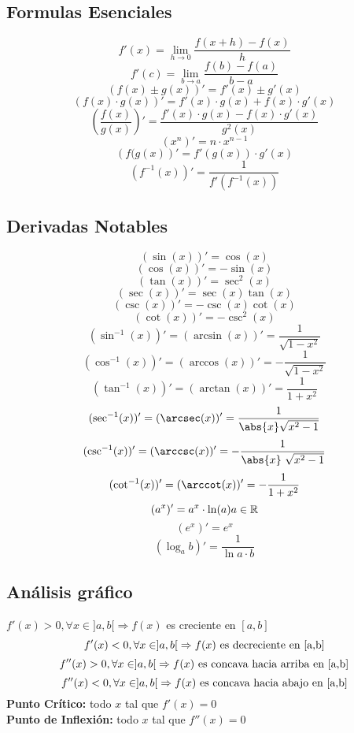 \headingFormulaSheet%
\subsection*{Formulas Esenciales}%
%
\[ f'(x)=\lim_{h \to 0}\frac{f(x+h)-f(x)}{h}\]
\[ f'(c)=\lim_{b\to a}\frac{f(b)-f(a)}{b-a}\]
\[(f(x)\pm g(x))'=f'(x)\pm g'(x) \]
\[ (f(x) \cdot g(x))'=f'(x) \cdot g(x) + f(x) \cdot g'(x)\]
\[ \left(\frac{f(x)}{g(x)}\right)'= \frac{f'(x)\cdot g(x)-f(x)\cdot g'(x)}{g^{2}(x)}
\]
\[\left(x^{n} \right)'= n\cdot x^{n-1}\]
\[ \left(f(g(x)\right)'=f'(g(x))\cdot g'(x)\]
\[\left(f^{-1}(x)\right)'=\frac{1}{f'(f^{-1}(x))}\]

\subsection*{Derivadas Notables}
\[ (\sin(x))'=\cos(x) \]
\[(\cos(x))'=-\sin(x) \]
\[ (\tan(x))'=\sec^{2}(x) \]
\[(\sec(x))'=\sec(x)\tan(x)\]
\[ (\csc(x))'=-\csc(x)\cot(x)\]
\[ (\cot(x))'=-\csc^{2}(x) \]
\[ (\sin^{-1}(x))'=(\arcsin(x))'=\frac{1}{\sqrt{1-x^{2}}} \]
\[(\cos^{-1}(x))'=(\arccos(x))'=-\frac{1}{\sqrt{1-x^{2}}}\]
\[(\tan^{-1}(x))'=(\arctan(x))'=\frac{1}{1+x^{2}}\]
\[(\sec^{-1}(x))'=(\arcsec(x))'=\frac{1}{\abs{x} \sqrt{x^2-1}}\]
\[(\csc^{-1}(x))'=(\arccsc(x))'=-\frac{1}{\abs{x}\ \sqrt{x^2-1}}\]
\[(\cot^{-1}(x))'=(\arccot(x))'=-\frac{1}{1+x^{2}}\]
\[(a^{x})'=a^{x} \cdot \ln(a) \\ a\in \mathbb{R}\]
\[(e^{x})' = e^{x}\]
\[(\log_{a}{b})'=\frac{1}{\ln{a} \cdot b}\]

\subsection*{Análisis gráfico}
$f'(x)>0, \forall x\in ]a,b[ \Rightarrow f(x)$ es creciente en $[a,b]$
\[f'(x)<0 ,\\ \forall x\in ]a,b[\\ \Rightarrow f(x)\\ \mbox{ es decreciente en [a,b]}  \]
\[f''(x)>0, \forall x\in ]a,b[ \\ \Rightarrow f(x) \mbox{ es concava hacia arriba en [a,b]}\]
\[f''(x)<0, \forall x\in ]a,b[ \\ \Rightarrow f(x) \mbox{ es concava hacia abajo en [a,b]} \]
\textbf{Punto Crítico:} todo $x$ tal que $f'(x)=0$\\
\textbf{Punto de Inflexión:} todo $x$ tal que $f''(x)=0$

